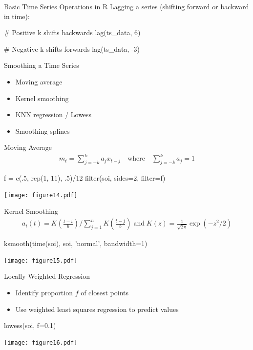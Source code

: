\documentclass[ignorenonframetext,xcolor=x11names]{beamer}
\begin{document}
\begin{frame}[fragile]{Basic Time Series Operations in R}
Lagging a series (shifting forward or backward in time):
\begin{Rcode}
# Positive k shifts backwards
lag(ts_data, 6)

# Negative k shifts forwards
lag(ts_data, -3)
\end{Rcode}
\end{frame}

\begin{frame}{Smoothing a Time Series}
\begin{itemize}
   \item Moving average
   \item Kernel smoothing
   \item KNN regression / Lowess
   \item Smoothing splines
\end{itemize}
\end{frame}

\begin{frame}[fragile]{Moving Average}
\begin{align*}m_t = \sum_{j=-k}^k a_j x_{t-j} \quad \text{where} \quad
\sum_{j=-k}^k a_j = 1
\end{align*}
\begin{Rcode}
f = c(.5, rep(1, 11), .5)/12
filter(soi, sides=2, filter=f)
\end{Rcode}
\begin{center}
\texttt{[image: figure14.pdf]}
\end{center}
\end{frame}

\begin{frame}[fragile]{Kernel Smoothing}
\begin{align*}a_i(t) = K\left(\frac{t-i}{b}\right) / \sum_{j=1}^n K \left(\frac{t-j}{b}\right) \; \text{and} \; K(z) = \frac{1}{\sqrt{2\pi}} \exp(-z^2/2) \end{align*}
\begin{Rcode}
ksmooth(time(soi), soi, 'normal', bandwidth=1)
\end{Rcode}
\begin{center}
\texttt{[image: figure15.pdf]}
\end{center}
\end{frame}

\begin{frame}[fragile]{Locally Weighted Regression}
\begin{itemize}
   \item Identify proportion $f$ of closest points
   \item Use weighted least squares regression to predict values
\end{itemize}
\begin{Rcode}
lowess(soi, f=0.1)
\end{Rcode}
\begin{center}
\texttt{[image: figure16.pdf]}
\end{center}
\end{frame}
\end{document}
